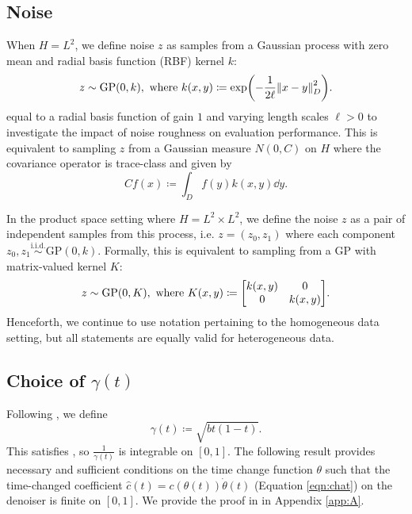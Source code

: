 \subsection{Noise}
When \(H = L^{2}\), we define noise \(z\) as samples from a Gaussian process \citep{williams2006gaussian} with zero mean and radial basis function (RBF) kernel \(k\):
\[
  z \sim \mathrm{GP}(0, k), \text{ where } k(x, y) \coloneqq \exp(-\frac{1}{2\ell} \norm{x - y}^{2}_{D}).
\] equal to a radial basis function of gain \(1\) and varying length scales \(\ell > 0\) to investigate the impact of noise roughness on evaluation performance. This is equivalent to sampling \(z\) from a Gaussian measure \(N(0, C)\) on \(H\) where the covariance operator is trace-class and given by
\[
  Cf(x) \coloneqq \int_{D} f(y) k(x, y) \dd{y}.
\]

In the product space setting where \(H = L^{2} \times L^{2}\), we define the noise \(z\) as a pair of independent samples from this process, i.e. \(z = (z_{0}, z_{1})\) where each component \(z_{0}, z_{1} \overset{\text{i.i.d.}}{\sim} \mathrm{GP}(0, k)\). Formally, this is equivalent to sampling from a GP with matrix-valued kernel \(K\):
\[
  z \sim \mathrm{GP}(0, K), \text{ where } K(x, y) \coloneqq \mqty[k(x,y) & 0 \\ 0 & k(x,y)].
\]
Henceforth, we continue to use notation pertaining to the homogeneous data setting, but all statements are equally valid for heterogeneous data.

\subsection{Choice of \(\gamma(t)\)} Following \citep{albergo2023stochasticinterpolantsunifyingframework}, we define
\[
  \gamma(t) \coloneqq \sqrt{bt(1-t)}.
\]
This satisfies , so \(\frac{1}{\gamma(t)}\) is integrable on \([0, 1]\). The following result provides necessary and sufficient conditions on the time change function \(\theta\) such that the time-changed coefficient \(\hat{c}(t) = c(\theta(t)) \dot{\theta}(t)\) (Equation \ref{eqn:chat}) on the denoiser is finite on \([0, 1]\). We provide the proof in  in Appendix \ref{app:A}.

